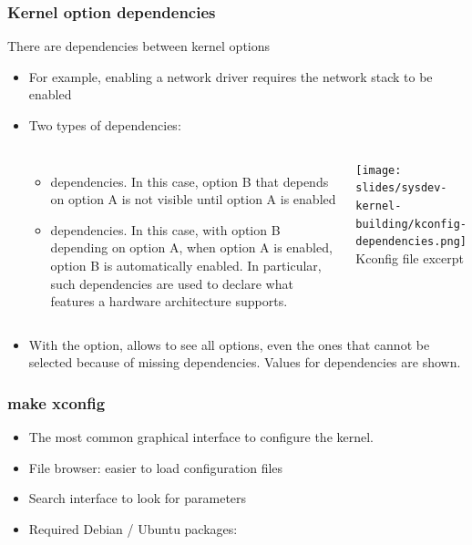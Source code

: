 \begin{frame}[fragile]
  \frametitle{Kernel option dependencies}
  There are dependencies between kernel options
  \begin{itemize}
  \item For example, enabling a network driver requires the network
    stack to be enabled
  \item Two types of dependencies:
  \begin{columns}
    \begin{itemize}
    \item {} dependencies. In this case, option B that
      depends on option A is not visible until option A is enabled
    \item {} dependencies. In this case, with option B
      depending on option A, when option A is enabled, option B is
      automatically enabled. In particular, such dependencies are
      used to declare what features a hardware architecture supports.
    \end{itemize}
    \texttt{[image: slides/sysdev-kernel-building/kconfig-dependencies.png]}\\
    \footnotesize Kconfig file excerpt
  \end{columns}
  \item With the  option,  allows
    to see all options, even the ones that cannot be selected because of
    missing dependencies. Values for dependencies are shown.
  \end{itemize}
\end{frame}

\begin{frame}
  \frametitle{make xconfig}
  \begin{itemize}
  \item The most common graphical interface to configure the kernel.
  \item File browser: easier to load configuration files
  \item Search interface to look for parameters
 \item Required Debian / Ubuntu packages: 
  \end{itemize}
\end{frame}


